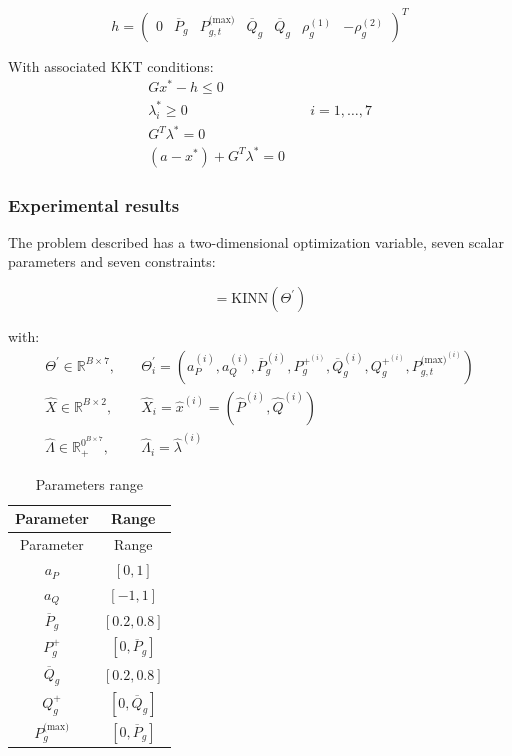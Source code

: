 \documentclass[
]{article}
\begin{document}
\begin{equation}
h = \begin{pmatrix}
0 & \overline{P}_g & P^{\textrm{(max)}}_{g,t} & \overline{Q}_g & \overline{Q}_g & \rho^{(1)}_g & -\rho^{(2)}_g
\end{pmatrix}^T
\end{equation}

With associated KKT conditions: \begin{align}
    G{x}^* - h \leq 0&\\
    \lambda_i^* \geq 0& \quad i=1,\dots, 7\\
    G^T\lambda^* = 0&\\
    (a-{x}^*) + G^T\lambda^*  = 0 &
\end{align}

\subsubsection{Experimental results}\label{experimental-results-2}

The problem described has a two-dimensional optimization variable, seven
scalar parameters and seven constraints:

\begin{equation}
 [\hat{X}, \hat\Lambda] = \mathrm{KINN}(\Theta^\prime)
\end{equation}

with: \begin{align}
\Theta^\prime \in \mathbb{R}^{B \times 7}, \quad&\Theta^\prime_{i} = (a_P^{(i)}, a_Q^{(i)},\overline{P}_g^{(i)},  P_g^{+^{(i)}}, \overline{Q}_g^{(i)},  Q_g^{+^{(i)}}, P^{\textrm{(max)}^{(i)}}_{g,t})\\
\hat{X} \in \mathbb{R}^{B \times 2}, \quad&\hat{X}_{i} = \hat{x}^{(i)} = (\hat{P}^{(i)}, \hat{Q}^{(i)})\\
\hat\Lambda \in \mathbb{R}_+^{0^{B \times 7}}, \quad&\hat\Lambda_{i} = \hat\lambda^{(i)}
\end{align}

\begin{longtable}[]{@{}cc@{}}
\caption{Parameters range}\label{tbl-proj-parameters}\tabularnewline
\toprule\noalign{}
Parameter & Range \\
\midrule\noalign{}
\endfirsthead
\toprule\noalign{}
Parameter & Range \\
\midrule\noalign{}
\endhead
\bottomrule\noalign{}
\endlastfoot
\(a_P\) & \([0 ,1]\) \\
\(a_Q\) & \([-1 ,1]\) \\
\(\overline{P}_g\) & \([0.2 ,0.8]\) \\
\(P_g^{+}\) & \([0 ,\overline{P}_g]\) \\
\(\overline{Q}_g\) & \([0.2 ,0.8]\) \\
\(Q_g^{+}\) & \([0 ,\overline{Q}_g]\) \\
\(P^{\textrm{(max)}}_{g}\) & \([0 ,\overline{P}_g]\) \\
\end{longtable}
\end{document}
